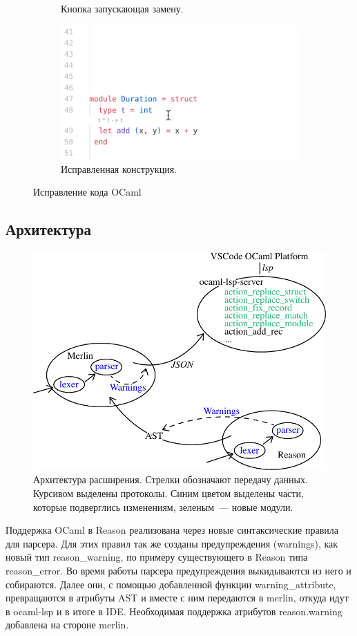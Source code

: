 \begin{figure}[h]
\begin{subfigure}{0.5\textwidth}
		\caption{Кнопка запускающая замену.}
	\end{subfigure}
	\begin{subfigure}{0.5\textwidth}
		\includegraphics[width=\linewidth]{screenshots/04.png}
		\caption{Исправленная конструкция.}
	\end{subfigure}
\caption{Исправление кода OCaml}
\end{figure}

\newpage

\subsection{Архитектура}
\begin{figure}[h]
	\includegraphics[width=\linewidth]{graph.pdf}
\caption{Архитектура расширения. Стрелки обозначают передачу данных. Курсивом выделены протоколы. Синим цветом выделены части, которые подверглись изменениям, зеленым~--- новые модули.}
\end{figure}
Поддержка OCaml в Reason реализована через новые синтаксические правила для парсера. Для этих правил так же созданы предупреждения (warnings), как новый тип reason\_warning, по примеру существующего в Reason типа reason\_error. Во время работы парсера предупреждения выкидываются из него и собираются. Далее они, с помощью добавленной функции warning\_attribute, превращаются в атрибуты AST и вместе с ним передаются в merlin, откуда идут в ocaml-lsp и в итоге в IDE. Необходимая поддержка атрибутов reason.warning добавлена на стороне merlin.

